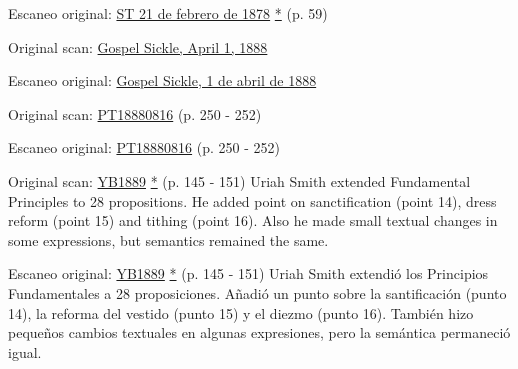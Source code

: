 Escaneo original: \href{https://documents.adventistarchives.org/Periodicals/ST/ST18780221-V04-08.pdf#search=%22As%20already%20stated%2C%20S%2E%20D%2E%20Adventists%22}{ST 21 de febrero de 1878} \href{https://forgotten-pillar.s3.us-east-2.amazonaws.com/ST18780221-V04-08.pdf}{*} (p. 59)






Original scan: \href{https://adventistdigitallibrary.org/adl-410336/gospel-sickle-april-1-1888?view_only=true&solr_nav%5Bid%5D=ff4d7f3f77b9bdf9e9ac&solr_nav%5Bpage%5D=0&solr_nav%5Boffset%5D=6}{Gospel Sickle, April 1, 1888}


Escaneo original: \href{https://adventistdigitallibrary.org/adl-410336/gospel-sickle-april-1-1888?view_only=true&solr_nav%5Bid%5D=ff4d7f3f77b9bdf9e9ac&solr_nav%5Bpage%5D=0&solr_nav%5Boffset%5D=6}{Gospel Sickle, 1 de abril de 1888}






Original scan: \href{https://adventistdigitallibrary.org/adl-402854/present-truth-august-16-1888?view_only=true&solr_nav%5Bid%5D=ff4d7f3f77b9bdf9e9ac&solr_nav%5Bpage%5D=0&solr_nav%5Boffset%5D=13}{PT18880816} (p. 250 - 252)


Escaneo original: \href{https://adventistdigitallibrary.org/adl-402854/present-truth-august-16-1888?view_only=true&solr_nav%5Bid%5D=ff4d7f3f77b9bdf9e9ac&solr_nav%5Bpage%5D=0&solr_nav%5Boffset%5D=13}{PT18880816} (p. 250 - 252)






Original scan: \href{https://documents.adventistarchives.org/Yearbooks/YB1889.pdf#search=Yearbook%201889}{YB1889} \href{https://forgotten-pillar.s3.us-east-2.amazonaws.com/YB1889.pdf}{*} (p. 145 - 151) Uriah Smith extended Fundamental Principles to 28 propositions. He added point on sanctification (point 14), dress reform (point 15) and tithing (point 16). Also he made small textual changes in some expressions, but semantics remained the same.


Escaneo original: \href{https://documents.adventistarchives.org/Yearbooks/YB1889.pdf#search=Yearbook%201889}{YB1889} \href{https://forgotten-pillar.s3.us-east-2.amazonaws.com/YB1889.pdf}{*} (p. 145 - 151) Uriah Smith extendió los Principios Fundamentales a 28 proposiciones. Añadió un punto sobre la santificación (punto 14), la reforma del vestido (punto 15) y el diezmo (punto 16). También hizo pequeños cambios textuales en algunas expresiones, pero la semántica permaneció igual.


